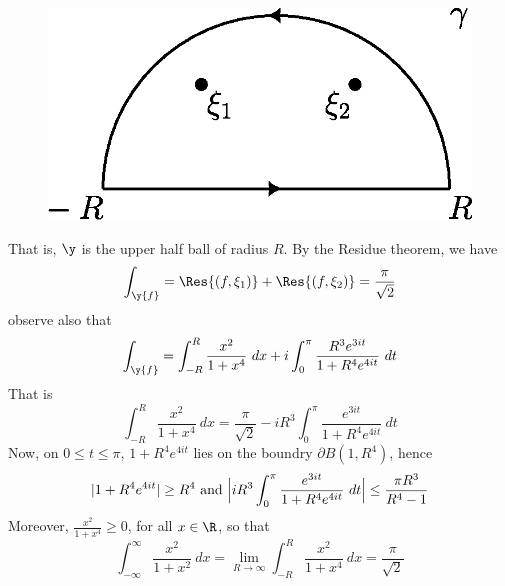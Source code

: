 \begin{example}
\begin{enumerate}
        \begin{figure}[h]
            \centering
            \includegraphics[scale=0.5]{Figures/Chapter5/contour_1.eps}
            \caption{}
            \label{figure_5.3}
        \end{figure}
        That is, $\y$ is the upper half ball of radius $R$. By the Residue
        theorem, we have
        \begin{equation*}
            \int_\y{f}=\Res{(f,\xi_1)}+\Res{(f,\xi_2)}= \frac{\pi}{\sqrt{2}}
        \end{equation*}
        observe also that
        \begin{equation*}
            \int_\y{f}=\int_{-R}^R{\frac{x^2}{1+x^4} \ dx}+
            i\int_0^\pi{\frac{R^3e^{3it}}{1+R^4e^{4it}} \ dt}
       \end{equation*}
       That is
        \begin{equation*}
            \int_{-R}^R{\frac{x^2}{1+x^4} \ dx}=\frac{\pi}{\sqrt{2}}-
            iR^3\int_0^\pi{\frac{e^{3it}}{1+R^4e^{4it}} \ dt}
       \end{equation*}
       Now, on $0 \leq t \leq \pi$, $1+R^4e^{4it}$ lies on the boundry
       $\partial{B(1,R^4)}$, hence
       \begin{equation*}
           |1+R^4e^{4it}| \geq R^4 \text{ and }
           \Big{|} iR^3\int_0^\pi{\frac{e^{3it}}{1+R^4e^{4it}} \ dt} \Big{|}
           \leq \frac{\pi{R^3}}{R^4-1}
       \end{equation*}
       Moreover, $\frac{x^2}{1+x^4} \geq 0$, for all $x \in \R$, so that
       \begin{equation*}
           \int_{-\infty}^\infty{\frac{x^2}{1+x^2} \ dx}=
           \lim_{R \xrightarrow{} \infty}{\int_{-R}^R{\frac{x^2}{1+x^4} \ dx}}=
           \frac{\pi}{\sqrt{2}}
       \end{equation*}


\end{enumerate}
\end{example}
